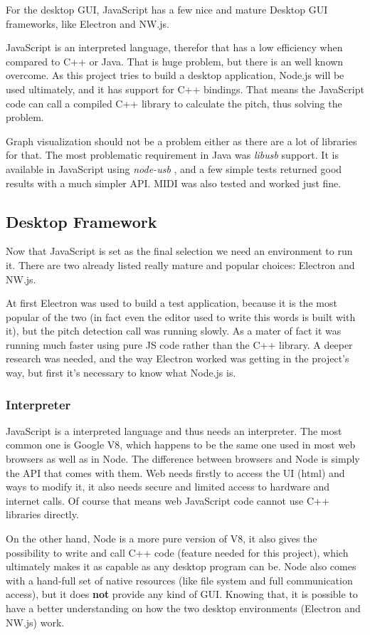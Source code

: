For the desktop GUI, JavaScript has a few nice and mature Desktop GUI frameworks,
like Electron and NW.js. 

JavaScript is an interpreted language, therefor that has a low efficiency when
compared to C++ or Java. That is huge problem, but there is an well known overcome. As
this project tries to build a desktop application, Node.js will be used ultimately,
and it has support for C++ bindings. That means the JavaScript code can call a
compiled C++ library to calculate the pitch, thus solving the problem. 

Graph visualization should not be a problem either as there are a lot of libraries
for that.
The most problematic requirement in Java was \textit{libusb} support. It is available
in JavaScript using \textit{node-usb} \cite{node-usb}, and a few simple tests
returned good results with a much simpler API. MIDI was also tested and worked just fine.

\subsection{Desktop Framework}
Now that JavaScript is set as the final selection we need an environment to run
it. There are two already listed really mature and popular choices: Electron and NW.js. 

At first Electron was used to build a test application, because it is the most popular
of the two (in fact even the editor used to write this words is built with it),
but the pitch detection call was running slowly. As a mater of fact it was running
much faster using pure JS code rather than the C++ library. A deeper research
was needed, and the way Electron worked was getting in the project's way, but first it's
necessary to know what Node.js is.

\subsubsection{Interpreter}
JavaScript is a interpreted language and thus needs an interpreter. The most
common one is Google V8, which happens to be the same one used in most web
browsers as well as in Node. The difference between browsers and Node is simply
the API that comes with them. Web needs firstly to access the UI (html) and ways to
modify it, it also needs secure and limited access to hardware and internet calls.
Of course that means web JavaScript code cannot use C++ libraries directly. 

On the other hand, Node is a more pure version of V8, it also gives the possibility
to write and call C++ code (feature needed for this project), which ultimately
makes it as capable as any desktop
program can be. Node also comes with a hand-full set of native resources (like
file system and full communication access), but it does \textbf{not} provide
any kind of GUI. Knowing that, it is possible to have a better understanding on
how the two desktop environments (Electron and NW.js) work.

